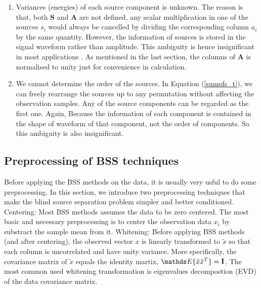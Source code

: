 \begin{enumerate}
    \item Variances (energies) of each source component is unknown. The reason is that, both $\mathbf{S}$ and $\mathbf{A}$ are not defined, any scalar multiplication in one of the sources $s_i$ would always be cancelled by dividing the corresponding column $a_i$ by the same quantity. However, the information of sources is stored in the signal waveform rather than amplitude. This ambiguity is hence insignificant in most applications \cite{HYVARINEN2000411}. 
    As mentioned in the last section, the columns of $\mathbf{A}$ is normalised to unity just for convenience in calculation.
    \item We cannot determine the order of the sources. In Equation (\ref{sumofs_t}), we can freely rearrange the sources up to any permutation without affecting the observation samples. Any of the source components can be regarded as the first one. Again, Because the information of each component is contained in the shape of waveform of that component, not the order of components. So this ambiguity is also insignificant.
\end{enumerate}



\subsection{Preprocessing of BSS techniques}
Before applying the BSS methods on the data, it is usually very usful to do some preprocessing. In this section, we introduce two preprocessing techniques that make the blind source separation problem simpler and better conditioned.
Centering:
Most BSS methods assumes the data to be zero centered. The most basic and necessary preprocessing is to center the observation data $x_i$ by substract the sample mean from it. 
Whitening:
Before applying BSS methods (and after centering), the observed vector $x$ is linearly transformed to $\tilde{x}$ so that each column is uncorrelated and have unity variance. More specifically, the covariance matrix of $\tilde{x}$ equals the identity martix, $\E\{\tilde{x}\tilde{x}^T\} = \mathbf{I}$. The most common used whitening transformation is eigenvalues decompostion (EVD) of the data covariance matrix.


